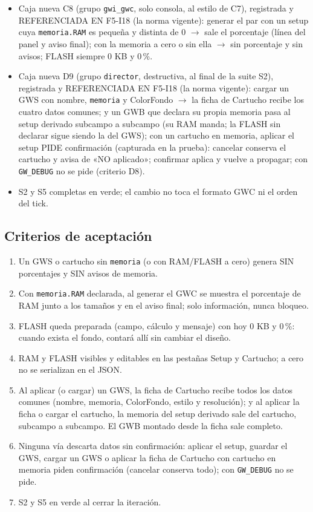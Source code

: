 \begin{itemize}
	\item Caja nueva C8 (grupo \texttt{gwi\_gwc}, solo consola, al estilo de
	C7), registrada y REFERENCIADA EN F5-I18 (la norma vigente): generar el
	par con un setup cuya \texttt{memoria.RAM} es pequeña y distinta de 0
	$\to$ sale el porcentaje (línea del panel y aviso final); con la
	memoria a cero o sin ella $\to$ sin porcentaje y sin avisos; FLASH
	siempre 0 KB y 0\,\%.
	\item Caja nueva D9 (grupo \texttt{director}, destructiva, al final de
	la suite S2), registrada y REFERENCIADA EN F5-I18 (la norma vigente):
	cargar un GWS con nombre, \texttt{memoria} y ColorFondo $\to$ la ficha
	de Cartucho recibe los cuatro datos comunes; y un GWB que declara su
	propia memoria pasa al setup derivado subcampo a subcampo (su RAM
	manda; la FLASH sin declarar sigue siendo la del GWS); con un cartucho en
	memoria, aplicar el setup PIDE confirmación (capturada en la prueba):
	cancelar conserva el cartucho y avisa de «NO aplicado»; confirmar
	aplica y vuelve a propagar; con \texttt{GW\_DEBUG} no se pide
	(criterio D8).
	\item S2 y S5 completas en verde; el cambio no toca el formato GWC ni el
	orden del tick.
\end{itemize}

\subsection{Criterios de aceptación}
\label{sec:F5I20Criterios}

\begin{enumerate}
	\item Un GWS o cartucho sin \texttt{memoria} (o con RAM/FLASH a cero)
	genera SIN porcentajes y SIN avisos de memoria.
	\item Con \texttt{memoria.RAM} declarada, al generar el GWC se muestra el
	porcentaje de RAM junto a los tamaños y en el aviso final; solo
	información, nunca bloqueo.
	\item FLASH queda preparada (campo, cálculo y mensaje) con hoy 0 KB y
	0\,\%: cuando exista el fondo, contará allí sin cambiar el diseño.
	\item RAM y FLASH visibles y editables en las pestañas Setup y Cartucho;
	a cero no se serializan en el JSON.
	\item Al aplicar (o cargar) un GWS, la ficha de Cartucho recibe todos
	los datos comunes (nombre, memoria, ColorFondo, estilo y resolución);
	y al aplicar la ficha o cargar el cartucho, la memoria del setup
	derivado sale del cartucho, subcampo a subcampo. El GWB montado
	desde la ficha sale completo.
	\item Ninguna vía descarta datos sin confirmación: aplicar el setup,
	guardar el GWS, cargar un GWS o aplicar la ficha de Cartucho con
	cartucho en memoria piden confirmación (cancelar conserva todo);
	con \texttt{GW\_DEBUG} no se pide.
	\item S2 y S5 en verde al cerrar la iteración.
\end{enumerate}